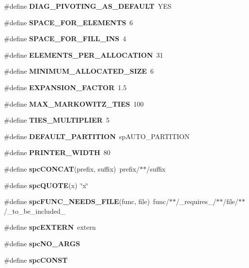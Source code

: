 \begin{CompactItemize}
\#define {\bf DIAG\_\-PIVOTING\_\-AS\_\-DEFAULT}\ YES
\item 
\#define {\bf SPACE\_\-FOR\_\-ELEMENTS}\ 6
\item 
\#define {\bf SPACE\_\-FOR\_\-FILL\_\-INS}\ 4
\item 
\#define {\bf ELEMENTS\_\-PER\_\-ALLOCATION}\ 31
\item 
\#define {\bf MINIMUM\_\-ALLOCATED\_\-SIZE}\ 6
\item 
\#define {\bf EXPANSION\_\-FACTOR}\ 1.5
\item 
\#define {\bf MAX\_\-MARKOWITZ\_\-TIES}\ 100
\item 
\#define {\bf TIES\_\-MULTIPLIER}\ 5
\item 
\#define {\bf DEFAULT\_\-PARTITION}\ sp\-AUTO\_\-PARTITION
\item 
\#define {\bf PRINTER\_\-WIDTH}\ 80
\item 
{}
\#define {\bf spc\-CONCAT}(prefix, suffix)\ prefix/$\ast$$\ast$/suffix\label{spConfig_8h_a34}

\item 
{}
\#define {\bf spc\-QUOTE}(x)\ \char`\"{}x\char`\"{}\label{spConfig_8h_a35}

\item 
{}
\#define {\bf spc\-FUNC\_\-NEEDS\_\-FILE}(func, file)\ func/$\ast$$\ast$/\_\-requires\_\-/$\ast$$\ast$/file/$\ast$$\ast$/\_\-to\_\-be\_\-included\_\-\label{spConfig_8h_a36}

\item 
{}
\#define {\bf spc\-EXTERN}\ extern\label{spConfig_8h_a37}

\item 
{}
\#define {\bf spc\-NO\_\-ARGS}\label{spConfig_8h_a38}

\item 
{}
\#define {\bf spc\-CONST}\label{spConfig_8h_a39}


\end{CompactItemize}
